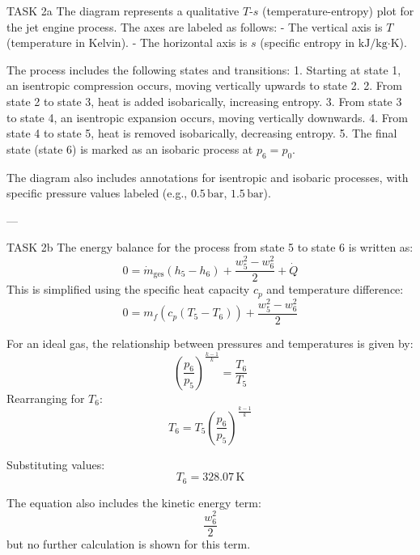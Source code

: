 TASK 2a  
The diagram represents a qualitative \( T \)-\( s \) (temperature-entropy) plot for the jet engine process. The axes are labeled as follows:  
- The vertical axis is \( T \) (temperature in Kelvin).  
- The horizontal axis is \( s \) (specific entropy in \( \text{kJ}/\text{kg·K} \)).  

The process includes the following states and transitions:  
1. Starting at state 1, an isentropic compression occurs, moving vertically upwards to state 2.  
2. From state 2 to state 3, heat is added isobarically, increasing entropy.  
3. From state 3 to state 4, an isentropic expansion occurs, moving vertically downwards.  
4. From state 4 to state 5, heat is removed isobarically, decreasing entropy.  
5. The final state (state 6) is marked as an isobaric process at \( p_6 = p_0 \).  

The diagram also includes annotations for isentropic and isobaric processes, with specific pressure values labeled (e.g., \( 0.5 \, \text{bar} \), \( 1.5 \, \text{bar} \)).  

---

TASK 2b  
The energy balance for the process from state 5 to state 6 is written as:  
\[
0 = \dot{m}_{\text{ges}} \left( h_5 - h_6 \right) + \frac{w_5^2 - w_6^2}{2} + \dot{Q}  
\]
This is simplified using the specific heat capacity \( c_p \) and temperature difference:  
\[
0 = m_f \left( c_p \left( T_5 - T_6 \right) \right) + \frac{w_5^2 - w_6^2}{2}  
\]

For an ideal gas, the relationship between pressures and temperatures is given by:  
\[
\left( \frac{p_6}{p_5} \right)^{\frac{k-1}{k}} = \frac{T_6}{T_5}  
\]
Rearranging for \( T_6 \):  
\[
T_6 = T_5 \left( \frac{p_6}{p_5} \right)^{\frac{k-1}{k}}  
\]

Substituting values:  
\[
T_6 = 328.07 \, \text{K}  
\]  

The equation also includes the kinetic energy term:  
\[
\frac{w_6^2}{2}  
\]  
but no further calculation is shown for this term.